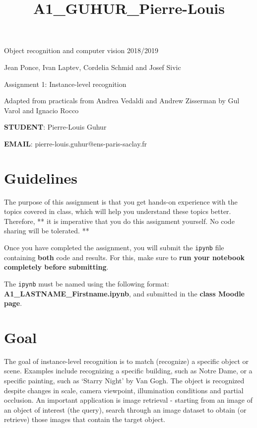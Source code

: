 \documentclass[11pt]{article}
\title{A1\_GUHUR\_Pierre-Louis}
\begin{document}
    
    
    \maketitle
    
    

    
    Object recognition and computer vision 2018/2019

Jean Ponce, Ivan Laptev, Cordelia Schmid and Josef Sivic

Assignment 1: Instance-level recognition

Adapted from practicals from Andrea Vedaldi and Andrew Zisserman by Gul
Varol and Ignacio Rocco

    \textbf{STUDENT}: Pierre-Louis Guhur

\textbf{EMAIL}: pierre-louis.guhur@ens-paris-saclay.fr

    \hypertarget{guidelines}{%
\section{Guidelines}\label{guidelines}}

The purpose of this assignment is that you get hands-on experience with
the topics covered in class, which will help you understand these topics
better. Therefore, ** it is imperative that you do this assignment
yourself. No code sharing will be tolerated. **

Once you have completed the assignment, you will submit the
\texttt{ipynb} file containing \textbf{both} code and results. For this,
make sure to \textbf{run your notebook completely before submitting}.

The \texttt{ipynb} must be named using the following format:
\textbf{A1\_LASTNAME\_Firstname.ipynb}, and submitted in the
\textbf{class Moodle page}.

    \hypertarget{goal}{%
\section{Goal}\label{goal}}

The goal of instance-level recognition is to match (recognize) a
specific object or scene. Examples include recognizing a specific
building, such as Notre Dame, or a specific painting, such as `Starry
Night' by Van Gogh. The object is recognized despite changes in scale,
camera viewpoint, illumination conditions and partial occlusion. An
important application is image retrieval - starting from an image of an
object of interest (the query), search through an image dataset to
obtain (or retrieve) those images that contain the target object.
\end{document}
